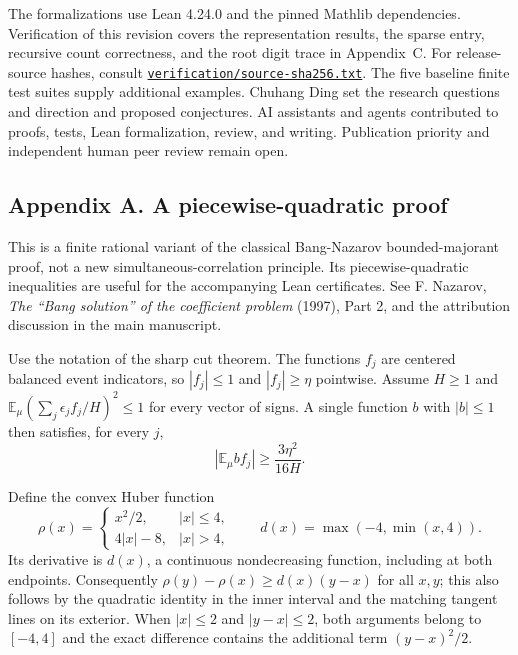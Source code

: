 \documentclass[
  11pt,
]{article}
\begin{document}
The formalizations use Lean 4.24.0 and the pinned Mathlib dependencies.
Verification of this revision covers the representation results,
the sparse entry, recursive count correctness, and the root digit
trace in Appendix~C. For release-source hashes, consult
\href{../verification/source-sha256.txt}{\nolinkurl{verification/source-sha256.txt}}. The five baseline finite test
suites supply additional examples. Chuhang Ding set the research questions and direction and proposed conjectures. AI assistants and agents contributed to proofs, tests, Lean formalization, review, and writing.
Publication priority and independent human peer review remain open.

\clearpage
\subsection{Appendix A. A piecewise-quadratic
proof}\label{appendix-a.-a-piecewise-quadratic-proof}

This is a finite rational variant of the classical Bang-Nazarov
bounded-majorant proof, not a new simultaneous-correlation principle.
Its piecewise-quadratic inequalities are useful for the accompanying
Lean certificates. See F. Nazarov, \emph{The ``Bang solution'' of the
coefficient problem} (1997), Part 2, and the attribution discussion in
the main manuscript.

Use the notation of the sharp cut theorem. The functions \(f_j\) are
centered balanced event indicators, so \(|f_j|\le1\) and
\(|f_j|\ge\eta\) pointwise. Assume \(H\ge1\) and
\(\mathbb E_\mu(\sum_j\epsilon_j f_j/H)^2\le1\) for every vector of
signs. A single function \(b\) with \(|b|\le1\) then satisfies, for every
\(j\), \[
                 |\mathbb E_\mu b f_j|\ge\frac{3\eta^2}{16H}.
\]

Define the convex Huber function \[
   \rho(x)=
      \begin{cases}
       x^2/2,&|x|\le4,\\
       4|x|-8,&|x|>4 ,
      \end{cases}
   \qquad d(x)=\max(-4,\min(x,4)).
\] Its derivative is \(d(x)\), a continuous nondecreasing function,
including at both endpoints. Consequently
\(\rho(y)-\rho(x)\ge d(x)(y-x)\) for all \(x,y\); this also follows by
the quadratic identity in the inner interval and the matching tangent
lines on its exterior. When \(|x|\le2\) and \(|y-x|\le2\), both
arguments belong to \([-4,4]\) and the exact difference contains the
additional term \((y-x)^2/2\).
\end{document}
